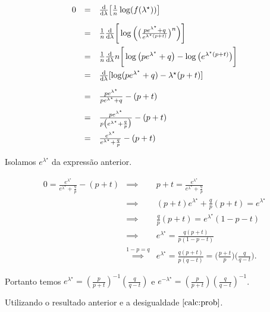 \documentclass{article}
\begin{document}
\begin{equation}\notag
	\begin{array}{rcl}
		0 & = & \frac{\mathrm d}{\mathrm d\lambda} \big[\frac{1}{n}\log(f({\lambda^\star}))\big]\\[1em]
		& = & \frac{1}{n}\frac{\mathrm d}{\mathrm d\lambda} \bigg[\log\Big(\big(\frac{pe^{\lambda^\star}+q}{e^{{\lambda^\star}(p+t)}}\big)^n\Big)\bigg]\\[1em]
		& = & \frac{1}{n}\frac{\mathrm d}{\mathrm d\lambda} n\bigg[\log\big(pe^{\lambda^\star} + q\big) - \log\big(e^{{\lambda^\star}(p+t)}\big)\bigg]\\[1em]
		& = & \frac{\mathrm d}{\mathrm d\lambda}[\log(pe^{\lambda^\star} + q) - {\lambda^\star}(p+t)]\\[1em]
		& = & \frac{pe^{\lambda^\star}}{pe^{\lambda^\star} + q} - (p+t)\\[1em]
		& = & \frac{pe^{\lambda^\star}}{p\big(e^{\lambda^\star} + \frac{q}{p}\big)} - (p+t)\\[1em]
		& = & \frac{e^{\lambda^\star}}{e^{\lambda^\star} + \frac{q}{p}} - (p+t)
	\end{array}
\end{equation}

Isolamos \(e^{\lambda^\star}\) da expressão anterior.

\begin{equation}
	\begin{array}{rcl}
		0 = \frac{e^{\lambda^\star}}{e^{\lambda^\star} + \frac{q}{p}} - (p+t) & \implies &	p+t = \frac{e^{\lambda^\star}}{e^{\lambda^\star} + \frac{q}{p}}\\[1em]
		& \implies & (p+t)e^{\lambda^\star} + \frac{q}{p}(p+t) = e^{\lambda^\star}\\[1em]
		& \implies & \frac{q}{p}(p+t) = e^{\lambda^\star}(1-p-t)\\[1em]
		& \implies & e^{\lambda^\star} = \frac{q(p+t)}{p(1-p-t)}\\[1em]
		& \overset{1-p = q}{\implies} & e^{\lambda^\star} = \frac{q(p+t)}{p(q-t)} = \big(\frac{p+t}{p}\big)\big(\frac{q}{q-t}\big).
	\end{array}
\end{equation} 

Portanto temos \(e^{\lambda^\star}=\left(\frac{p}{p+t}\right)^{-1}\left(\frac{q}{q-t}\right)\) e \(e^{-\lambda^\star}=\left(\frac{p}{p+t}\right)\left(\frac{q}{q-t}\right)^{-1}\).

\hfill

Utilizando o resultado anterior e a desigualdade \(\eqref{calc:prob}\).
\end{document}
